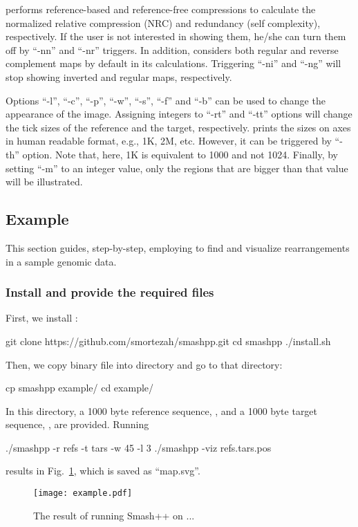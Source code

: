 \smashpp performs reference-based and reference-free compressions to calculate the normalized relative compression (NRC) and redundancy (self complexity), respectively. If the user is not interested in showing them, he/she can turn them off by ``-nn'' and ``-nr'' triggers. In addition, \smashpp considers both regular and reverse complement maps by default in its calculations. Triggering ``-ni'' and ``-ng'' will stop showing inverted and regular maps, respectively.

Options ``-l'', ``-c'', ``-p'', ``-w'', ``-s'', ``-f'' and ``-b'' can be used to change the appearance of the image. Assigning integers to ``-rt'' and ``-tt'' options will change the tick sizes of the reference and the target, respectively. \smashpp prints the sizes on axes in human readable format, e.g., 1K, 2M, etc. However, it can be triggered by ``-th'' option. Note that, here, 1K is equivalent to 1000 and not 1024. Finally, by setting ``-m'' to an integer value, only the regions that are bigger than that value will be illustrated.

\subsection{Example}
This section guides, step-by-step, employing \smashpp to find and visualize rearrangements in a sample genomic data.

\subsubsection*{Install \smashpp and provide the required files}
First, we install \smashpp:
\begin{code}[style=bash]
git clone https://github.com/smortezah/smashpp.git
cd smashpp
./install.sh
\end{code}
Then, we copy  binary file into  directory and go to that directory:
\begin{code}[style=bash]
cp smashpp example/
cd example/
\end{code}
In this directory, a 1000 byte reference sequence, , and a 1000 byte target sequence, , are provided. Running
\begin{code}[style=bash]
./smashpp -r refs -t tars -w 45 -l 3
./smashpp -viz refs.tars.pos
\end{code}
results in Fig.~\ref{fig.example}, which is saved as ``map.svg''.

\begin{figure}[!h]
  \texttt{[image: example.pdf]}
  \caption{The result of running Smash++ on ...}
  \label{fig.example}
\end{figure}